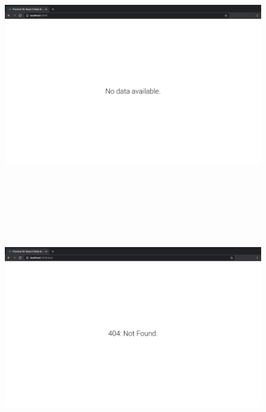 \documentclass{article}
\begin{document}
\begin{figure}[H]
  \includegraphics[width=175mm, height=105mm]{./img/18-expected-opentdb-3.png}
  \includegraphics[width=175mm, height=105mm]{./img/18-expected-opentdb-4.png}
\end{figure}
\end{document}
